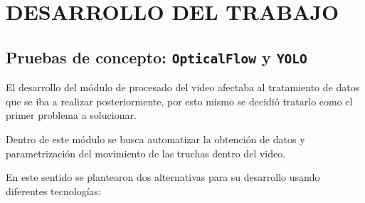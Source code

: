 \section{DESARROLLO DEL TRABAJO}

\subsection{Pruebas de concepto: \texttt{OpticalFlow} y \texttt{YOLO}}

El desarrollo del módulo de procesado del video afectaba al tratamiento de datos que se iba a realizar posteriormente, por esto mismo se decidió 
tratarlo como el primer problema a solucionar.

Dentro de este módulo se busca automatizar la obtención de datos y parametrización del movimiento de las truchas dentro del video.

En este sentido se plantearon dos alternativas para su desarrollo usando diferentes tecnologías:

